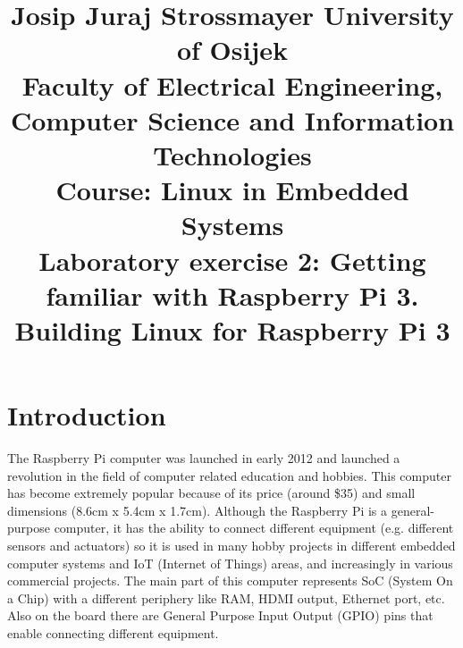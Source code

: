 \documentclass[11pt]{article}
\title{
	\Large Josip Juraj Strossmayer University of Osijek \\
	Faculty of Electrical Engineering, Computer Science and Information
	 Technologies\\
	\vspace{4cm}
	\Large Course: Linux in Embedded Systems \\
	\vspace{4cm}
	\Large \textbf{Laboratory exercise 2: Getting familiar with Raspberry Pi
		3.\\
		Building Linux for Raspberry Pi 3}
	}
\date{}
\begin{document}
\maketitle
\thispagestyle{empty}
\newpage

\section{Introduction}
The Raspberry Pi computer was launched in early 2012 and launched a revolution
 in the field of computer related education and hobbies. This computer has
 become extremely popular because of its price (around \$35) and small
 dimensions (8.6cm x 5.4cm x 1.7cm). Although the Raspberry Pi is a
 general-purpose computer, it has the ability to connect different equipment
 (e.g. different sensors and actuators) so it is used in many hobby projects in
 different embedded computer systems and IoT (Internet of Things) areas, and
 increasingly in various commercial projects. The main part of this computer
 represents SoC (System On a Chip) with a different periphery like
 RAM, HDMI output, Ethernet port, etc. Also on the board there are General
 Purpose Input Output (GPIO) pins that enable connecting different equipment.
\end{document}
